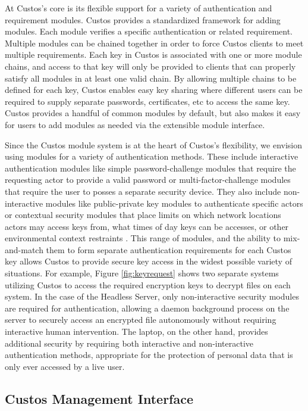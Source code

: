 At Custos's core is its flexible support for a variety of
authentication and requirement modules. Custos provides a standardized
framework for adding modules. Each module verifies a specific
authentication or related requirement. Multiple modules can be chained
together in order to force Custos clients to meet multiple
requirements. Each key in Custos is associated with one or more module
chains, and access to that key will only be provided to clients that
can properly satisfy all modules in at least one valid chain. By
allowing multiple chains to be defined for each key, Custos enables
easy key sharing where different users can be required to supply
separate passwords, certificates, etc to access the same key. Custos
provides a handful of common modules by default, but also makes it
easy for users to add modules as needed via the extensible module
interface.

Since the Custos module system is at the heart of Custos's
flexibility, we envision using modules for a variety of authentication
methods. These include interactive authentication modules like simple
password-challenge modules that require the requesting actor to
provide a valid password or multi-factor-challenge modules that
require the user to posses a separate security device. They also
include non-interactive modules like public-private key modules to
authenticate specific actors or contextual security modules that place
limits on which network locations actors may access keys from, what
times of day keys can be accesses, or other environmental context
restraints \cite{Hulsebosch2005}. This range of modules, and the
ability to mix-and-match them to form separate authentication
requirements for each Custos key allows Custos to provide secure key
access in the widest possible variety of situations. For example,
Figure \ref{fig:keyrequest} shows two separate systems utilizing
Custos to access the required encryption keys to decrypt files on each
system. In the case of the Headless Server, only non-interactive
security modules are required for authentication, allowing a daemon
background process on the server to securely access an encrypted file
autonomously without requiring interactive human intervention. The
laptop, on the other hand, provides additional security by requiring
both interactive and non-interactive authentication methods,
appropriate for the protection of personal data that is only ever
accessed by a live user.

\subsection{Custos Management Interface}

